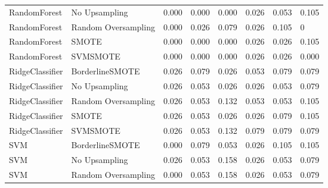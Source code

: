 \begin{tabular}{llllllll}
                RandomForest &       No Upsampling & 0.000 &                     0.000 &                 0.000 &                  0.026 &                                   0.053 &     0.105 \\
                RandomForest & Random Oversampling & 0.000 &                     0.026 &                 0.079 &                  0.026 &                                   0.105 &         0 \\
                RandomForest &               SMOTE & 0.000 &                     0.000 &                 0.000 &                  0.026 &                                   0.026 &     0.105 \\
                RandomForest &            SVMSMOTE & 0.000 &                     0.000 &                 0.000 &                  0.026 &                                   0.026 &     0.000 \\
             RidgeClassifier &     BorderlineSMOTE & 0.026 &                     0.079 &                 0.026 &                  0.053 &                                   0.079 &     0.079 \\
             RidgeClassifier &       No Upsampling & 0.026 &                     0.053 &                 0.026 &                  0.026 &                                   0.053 &     0.079 \\
             RidgeClassifier & Random Oversampling & 0.026 &                     0.053 &                 0.132 &                  0.053 &                                   0.053 &     0.105 \\
             RidgeClassifier &               SMOTE & 0.026 &                     0.053 &                 0.026 &                  0.026 &                                   0.079 &     0.105 \\
             RidgeClassifier &            SVMSMOTE & 0.026 &                     0.053 &                 0.132 &                  0.079 &                                   0.079 &     0.079 \\
                         SVM &     BorderlineSMOTE & 0.000 &                     0.079 &                 0.053 &                  0.026 &                                   0.105 &     0.105 \\
                         SVM &       No Upsampling & 0.026 &                     0.053 &                 0.158 &                  0.026 &                                   0.053 &     0.079 \\
                         SVM & Random Oversampling & 0.000 &                     0.053 &                 0.158 &                  0.026 &                                   0.053 &     0.079 \\

\end{tabular}
